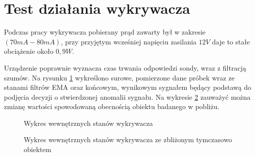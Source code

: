 \section{Test działania wykrywacza}

Podczas pracy wykrywacza pobierany prąd zawarty był w zakresie $(70mA - 80mA)$, przy przyjętym wcześniej napięciu zasilania $12V$ daje to stałe obciążenie około $0,9W$.

Urządzenie poprawnie wyznacza czas trwania odpowiedzi sondy, wraz z filtracją szumów. Na rysunku \ref{fig:filtry_wewnetrzne} wykreślono surowe, pomierzone dane próbek wraz ze stanami filtrów EMA oraz końcowym, wynikowym sygnałem
będący podstawą do podjęcia decyzji o stwierdzonej anomalii sygnału. Na wykresie \ref{fig:filtry_wykryte} zauważyć można zmianę wartości spowodowaną obecnością obiektu badanego w pobliżu.


\begin{figure}
    \centering
    
    \caption{Wykres wewnętrznych stanów wykrywacza}\label{fig:filtry_wewnetrzne}
\end{figure}

\begin{figure}
    \centering
    
    \caption{Wykres wewnętrznych stanów wykrywacza ze zbliżonym tymczasowo obiektem}\label{fig:filtry_wykryte}
\end{figure}


